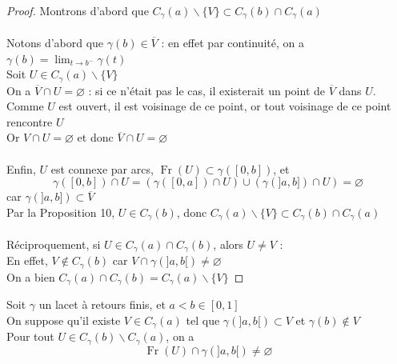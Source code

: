 \documentclass{article}
\begin{document}
\begin{flushleft}
\begin{proof}
    Montrons d'abord que $C_{\gamma}(a) \backslash \{ V \} \subset C_{\gamma}(b) \cap C_{\gamma}(a)$
    \\~\\
    Notons d'abord que $\gamma(b) \in \overline{V}$ : en effet par continuité, on a
    $\gamma(b) = \lim_{t \rightarrow b^-} \gamma(t)$\\
    Soit $U \in C_{\gamma}(a) \backslash \{ V \}$\\
    On a $\overline{V} \cap U = \varnothing$ : si ce n'était pas le cas, il existerait un point de $\overline{V}$
    dans $U$. Comme $U$ est ouvert, il est voisinage de ce point, or tout voisinage de ce point rencontre $U$\\
    Or $V \cap U = \varnothing$ et donc $\overline{V} \cap U = \varnothing$
    \\~\\
    Enfin, $U$ est connexe par arcs, $\operatorname{Fr}(U) \subset \gamma([0, b])$, et
    \[ \gamma([0, b]) \cap U = (\gamma([0, a]) \cap U) \cup (\gamma(]a, b]) \cap U) = \varnothing\]
    car $\gamma(]a, b]) \subset \overline{V}$\\
    Par la Proposition 10, $U \in C_{\gamma}(b)$, donc $C_{\gamma}(a) \backslash \{ V \} \subset C_{\gamma}(b) \cap C_{\gamma}(a)$
    \\~\\
    Réciproquement, si $U \in C_{\gamma}(a) \cap C_{\gamma}(b)$, alors $U \neq V$ :\\
    En effet, $V \notin C_{\gamma}(b)$ car $V \cap \gamma(]a, b[) \neq \varnothing$\\
    On a bien $C_{\gamma}(a) \cap C_{\gamma}(b) = C_{\gamma}(a) \backslash \{ V \}$
\end{proof}

\begin{tcolorbox}[colback = purple!20!white, colframe = purple!60!white, title = Lemme 1]
    Soit $\gamma$ un lacet à retours finis, et $a < b \in [0, 1]$\\
    On suppose qu'il existe $V \in C_{\gamma}(a)$ tel que $\gamma(]a, b[) \subset V$ et $\gamma(b) \notin V$\\
    Pour tout $U \in C_{\gamma}(b) \backslash C_{\gamma}(a)$, on a
    \[ \operatorname{Fr}(U) \cap \gamma(]a, b[) \neq \varnothing\]
\end{tcolorbox}


\end{flushleft}
\end{document}
